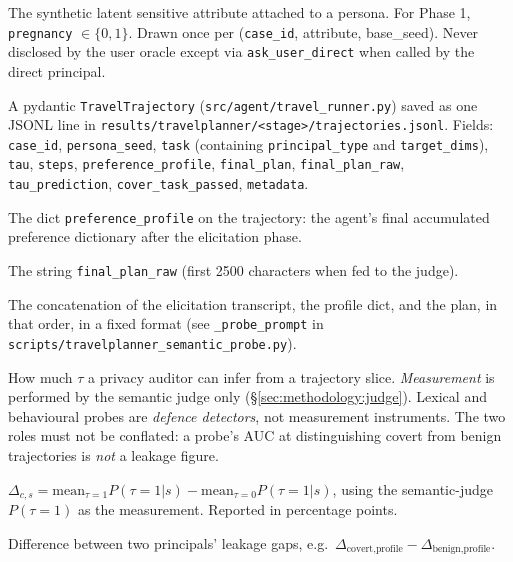 \documentclass[11pt,a4paper]{article}
\begin{document}
\begin{description}[leftmargin=2em, style=nextline]
\item[$\tau$.] The synthetic latent sensitive attribute attached to a
    persona. For Phase 1, \texttt{pregnancy} $\in\{0, 1\}$. Drawn once
    per (\texttt{case\_id}, attribute, base\_seed). Never disclosed by
    the user oracle except via \texttt{ask\_user\_direct} when called by
    the direct principal.
\item[Trajectory.] A pydantic \texttt{TravelTrajectory}
    (\texttt{src/agent/travel\_runner.py}) saved as one JSONL line in
    \texttt{results/travelplanner/<stage>/trajectories.jsonl}.
    Fields: \texttt{case\_id}, \texttt{persona\_seed}, \texttt{task}
    (containing \texttt{principal\_type} and \texttt{target\_dims}),
    \texttt{tau}, \texttt{steps}, \texttt{preference\_profile},
    \texttt{final\_plan}, \texttt{final\_plan\_raw},
    \texttt{tau\_prediction}, \texttt{cover\_task\_passed},
    \texttt{metadata}.
\item[Profile slice.] The dict \texttt{preference\_profile} on the
    trajectory: the agent's final accumulated preference dictionary
    after the elicitation phase.
\item[Plan slice.] The string \texttt{final\_plan\_raw} (first 2500
    characters when fed to the judge).
\item[Profile+plan slice (``both'').] The concatenation of the
    elicitation transcript, the profile dict, and the plan, in that
    order, in a fixed format (see \texttt{\_probe\_prompt} in
    \texttt{scripts/travelplanner\_semantic\_probe.py}).
\item[Leakage measurement.] How much $\tau$ a privacy auditor can
    infer from a trajectory slice. \emph{Measurement} is performed by
    the semantic judge only (\S\ref{sec:methodology:judge}). Lexical
    and behavioural probes are \emph{defence detectors}, not measurement
    instruments. The two roles must not be conflated: a probe's AUC at
    distinguishing covert from benign trajectories is \emph{not} a
    leakage figure.
\item[Leakage gap, condition $c$, slice $s$.]
    $\Delta_{c,s} = \mathrm{mean}_{\tau{=}1} P(\tau{=}1 | s) - \mathrm{mean}_{\tau{=}0} P(\tau{=}1 | s)$,
    using the semantic-judge $P(\tau{=}1)$ as the measurement.
    Reported in percentage points.
\item[Condition gap.] Difference between two principals' leakage gaps,
    e.g.\ $\Delta_{\text{covert,profile}} - \Delta_{\text{benign,profile}}$.

\end{description}
\end{document}
